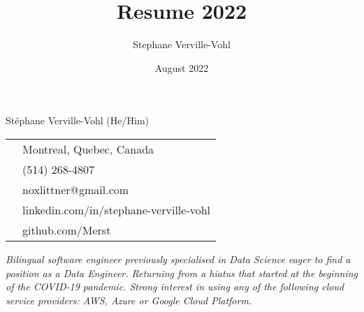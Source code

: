 \documentclass[letterpaper, 10pt]{article}
\title{Resume 2022}
\author{Stephane Verville-Vohl}
\date{August 2022}
\begin{document}
\pagestyle{empty} %


\begin{center}
    {\Huge {Stéphane Verville-Vohl}} {\huge(He/Him)}\\
\end{center}

\begin{tabular}{rl}
    \faGlobeAmericas { :} & Montreal, Quebec, Canada \\
    \faPhoneSquare   { :} & (514) 268-4807 \\
    \faAt            { :} & noxlittner@gmail.com \\
    \faLinkedin      { :} & linkedin.com/in/stephane-verville-vohl \\
    \faGithubSquare  { :} & github.com/Merst
\end{tabular}


\begin{center}\large{\emph{Bilingual software engineer previously specialised in Data Science eager to find a position as a Data Engineer. Returning from a hiatus that started at the beginning of the COVID-19 pandemic. Strong interest in using any of the following cloud service providers: AWS, Azure or Google Cloud Platform.}}\\
\end{center}
\end{document}
